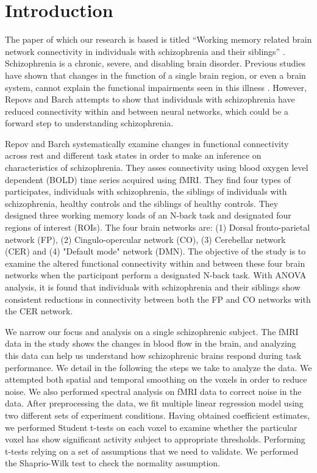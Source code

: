 \section{Introduction}

\par The paper of which our research is based is titled ``Working memory related
brain network connectivity in individuals with schizophrenia and their
siblings'' \cite{repovs_barch1, repovs_barch2}. Schizophrenia is a chronic,
severe, and disabling brain disorder. Previous studies have shown that changes
in the function of a single brain region, or even a brain system, cannot explain
the functional impairments seen in this illness \cite{kircher_thienel, repovs_barch1}.
However, Repovs and Barch attempts to show that individuals with schizophrenia
have reduced connectivity within and between neural networks, which could be a
forward step to understanding schizophrenia. 

Repov and Barch systematically examine changes in functional connectivity across
rest and different task states in order to make an inference on characteristics
of schizophrenia. They asses connectivity using blood oxygen level dependent
(BOLD) time series acquired using fMRI. They find four types of participates, individuals with
schizophrenia, the siblings of individuals with schizophrenia, healthy controls
and the siblings of healthy controls. They designed three working memory loads
of an N-back task and designated four regions of interest (ROIs). The four brain
networks are: (1) Dorsal fronto-parietal network (FP), (2) Cingulo-opercular
network (CO), (3) Cerebellar network (CER) and (4) "Default mode" network (DMN).
The objective of the study is to examine the altered functional connectivity
within and between these four brain networks when the participant perform a
designated N-back task. With ANOVA analysis, it is found that individuals with
schizophrenia and their siblings show consistent reductions in connectivity
between both the FP and CO networks with the CER network. 

We narrow our focus and analysis on a single schizophrenic
subject. The fMRI data in the study shows the changes in
blood flow in the brain, and analyzing this data can help us understand how
schizophrenic brains respond during task performance. We detail in the following the steps
we take to analyze the data. We attempted both spatial and temporal smoothing on
the voxels in order to reduce noise. We also performed spectral analysis on fMRI data to
correct noise in the data. After preprocessing the data, we fit
multiple linear regression model using two different sets of experiment
conditions. Having obtained coefficient estimates, we performed Student t-tests
on each voxel to examine whether the particular voxel has show significant
activity subject to appropriate thresholds. Performing t-tests relying on a set
of assumptions that we need to validate. We performed the Shaprio-Wilk test to
check the normality assumption.

